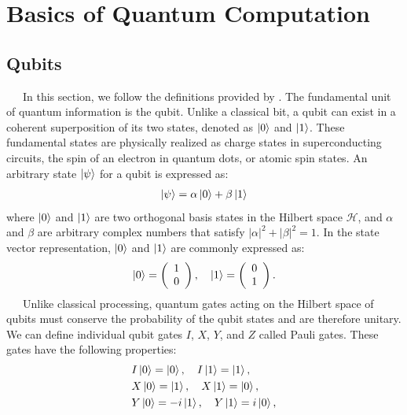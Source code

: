 \documentclass[a4paper,11pt]{ltjsarticle}
\begin{document}
\section{Basics of Quantum Computation}{
    \subsection{Qubits}\label{qubits}{
        \ \ \ In this section, we follow the definitions provided by \cite{devitt2013}. The fundamental unit of quantum information is the qubit. Unlike a classical bit, a qubit can exist in a coherent superposition of its two states, denoted as $\ket{0}$ and $\ket{1}$. These fundamental states are physically realized as charge states in superconducting circuits, the spin of an electron in quantum dots, or atomic spin states. An arbitrary state $\ket{\psi}$ for a qubit is expressed as:
        \begin{align}
            \ket{\psi}=\alpha\ket{0}+\beta\ket{1}
        \end{align}
        where $\ket{0}$ and $\ket{1}$ are two orthogonal basis states in the Hilbert space $\mathcal{H}$, and $\alpha$ and $\beta$ are arbitrary complex numbers that satisfy $|\alpha|^2 + |\beta|^2 = 1$. In the state vector representation, $\ket{0}$ and $\ket{1}$ are commonly expressed as:
        \begin{align}
            \ket{0} =\left(\begin{array}{c}
                1\\
                0
            \end{array}\right),\ \ \ 
            \ket{1} =\left(\begin{array}{c}
                0\\
                1
            \end{array}\right).
        \end{align}
        \ \ \ Unlike classical processing, quantum gates acting on the Hilbert space of qubits must conserve the probability of the qubit states and are therefore unitary. We can define individual qubit gates $I$, $X$, $Y$, and $Z$ called Pauli gates. These gates have the following properties:
        \begin{align}
            &I\ket{0}=\ket{0},\ \ \ I\ket{1}=\ket{1},\nonumber\\
            &X\ket{0}=\ket{1},\ \ \ X\ket{1}=\ket{0},\\
            &Y\ket{0}=-i\ket{1},\ \ \ Y\ket{1}=i\ket{0},\nonumber\\

\end{align}}}
\end{document}
